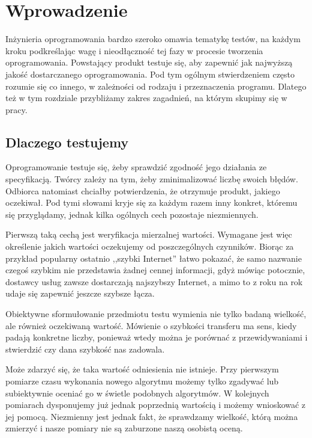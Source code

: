 \documentclass[00-praca-magisterska.tex]{subfiles}
\begin{document}
\chapter{Wprowadzenie}

Inżynieria oprogramowania bardzo szeroko omawia tematykę testów, na każdym
kroku podkreślając wagę i nieodłączność tej fazy w procesie tworzenia
oprogramowania.  Powstający produkt testuje się, aby zapewnić jak najwyższą
jakość dostarczanego oprogramowania. Pod tym ogólnym stwierdzeniem często
rozumie się co innego, w zależności od rodzaju i przeznaczenia programu.
Dlatego też w tym rozdziale przybliżamy zakres zagadnień, na którym skupimy się
w pracy.

\section{Dlaczego testujemy}

Oprogramowanie testuje się, żeby sprawdzić zgodność jego działania ze specyfikacją. Twórcy
zależy na tym, żeby zminimalizować liczbę swoich błędów. Odbiorca natomiast
chciałby potwierdzenia, że otrzymuje produkt, jakiego oczekiwał. Pod tymi
słowami kryje się za każdym razem inny konkret, któremu się przyglądamy, jednak
kilka ogólnych cech pozostaje niezmiennych.

Pierwszą taką cechą jest weryfikacja mierzalnej wartości.  Wymagane jest więc
określenie jakich wartości oczekujemy od poszczególnych czynników. Biorąc za
przykład popularny ostatnio ,,szybki Internet'' łatwo pokazać, że samo nazwanie
czegoś szybkim nie przedstawia żadnej cennej informacji, gdyż mówiąc potocznie,
dostawcy usług zawsze dostarczają najszybszy Internet, a mimo to z roku na
rok udaje się zapewnić jeszcze szybsze łącza.

Obiektywne sformułowanie przedmiotu testu wymienia nie tylko badaną wielkość,
ale również oczekiwaną wartość. Mówienie o szybkości transferu ma sens, kiedy
padają konkretne liczby, ponieważ wtedy można je porównać z przewidywaniami i
stwierdzić czy dana szybkość nas zadowala.

Może zdarzyć się, że taka wartość odniesienia nie istnieje. Przy pierwszym
pomiarze czasu wykonania nowego algorytmu możemy tylko zgadywać lub subiektywnie
oceniać go w świetle podobnych algorytmów. W kolejnych pomiarach dysponujemy już
jednak poprzednią wartością i możemy wnioskować z jej pomocą.  Niezmienny jest
jednak fakt, że sprawdzamy wielkość, którą można zmierzyć i nasze pomiary nie są
zaburzone naszą osobistą oceną.
\end{document}
